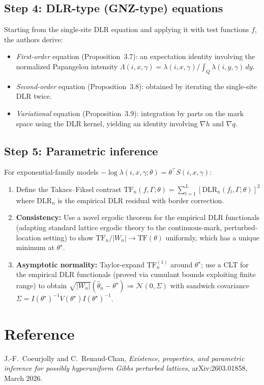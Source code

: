 \documentclass[11pt,a4paper]{article}
\begin{document}
\subsection*{Step 4: DLR-type (GNZ-type) equations}
Starting from the single-site DLR equation and applying it with test functions $f$, the authors derive:
\begin{itemize}[nosep]
  \item \emph{First-order} equation (Proposition~3.7): an expectation identity involving the normalized Papangelou intensity $\Lambda(i,x,\gamma)=\lambda(i,x,\gamma)/\int_Q\lambda(i,y,\gamma)\,dy$.
  \item \emph{Second-order} equation (Proposition~3.8): obtained by iterating the single-site DLR twice.
  \item \emph{Variational} equation (Proposition~3.9): integration by parts on the mark space using the DLR kernel, yielding an identity involving $\nabla h$ and $\nabla q$.
\end{itemize}

\subsection*{Step 5: Parametric inference}
For exponential-family models $-\log\lambda(i,x,\gamma;\theta)=\theta^\top S(i,x,\gamma)$:
\begin{enumerate}[nosep]
  \item Define the Takacs--Fiksel contrast $\mathrm{TF}_n(f,\Gamma;\theta)=\sum_{l=1}^L[\mathrm{DLR}_n(f_l,\Gamma;\theta)]^2$ where $\mathrm{DLR}_n$ is the empirical DLR residual with border correction.
  \item \textbf{Consistency:} Use a novel ergodic theorem for the empirical DLR functionals (adapting standard lattice ergodic theory to the continuous-mark, perturbed-location setting) to show $\mathrm{TF}_n/|W_n|\to\mathrm{TF}(\theta)$ uniformly, which has a unique minimum at $\theta^\star$.
  \item \textbf{Asymptotic normality:} Taylor-expand $\mathrm{TF}_n^{(1)}$ around $\theta^\star$; use a CLT for the empirical DLR functionals (proved via cumulant bounds exploiting finite range) to obtain $\sqrt{|W_n|}(\hat\theta_n-\theta^\star)\Rightarrow\mathcal{N}(0,\Sigma)$ with sandwich covariance $\Sigma=I(\theta^\star)^{-1}V(\theta^\star)I(\theta^\star)^{-1}$.
\end{enumerate}

\section*{Reference}
J.-F.\ Coeurjolly and C.\ Renaud-Chan, \emph{Existence, properties, and parametric inference for possibly hyperuniform Gibbs perturbed lattices}, arXiv:2603.01858, March 2026.
\end{document}
